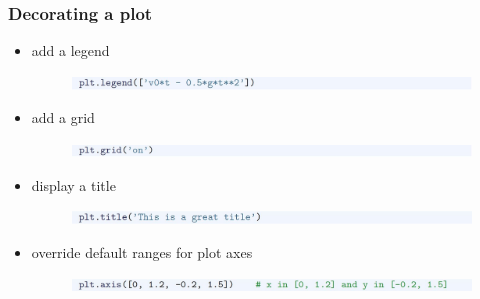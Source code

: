 \documentclass[14pt]{beamer}
\begin{document}

\begin{frame}[fragile]
\frametitle{Decorating a plot}

\begin{itemize}
	\item add a legend
	\vspace*{-5mm}
	\begin{figure}[ht]
		\centering
		\includegraphics[width=\textwidth]{figures/LLp24c}
	\end{figure}

	\item add a grid
	\vspace*{-5mm}
	\begin{figure}[ht]
		\centering
		\includegraphics[width=\textwidth]{figures/LLp24d}
	\end{figure}
	\item display a title
\vspace*{-5mm}
	\begin{figure}[ht]
		\centering
		\includegraphics[width=\textwidth]{figures/LLp24e}
	\end{figure}
	\item override default ranges for plot axes
	\vspace*{-5mm}
	\begin{figure}[ht]
		\centering
		\includegraphics[width=\textwidth]{figures/LLp24f}
	\end{figure}
\end{itemize}

\end{frame}

\end{document}
